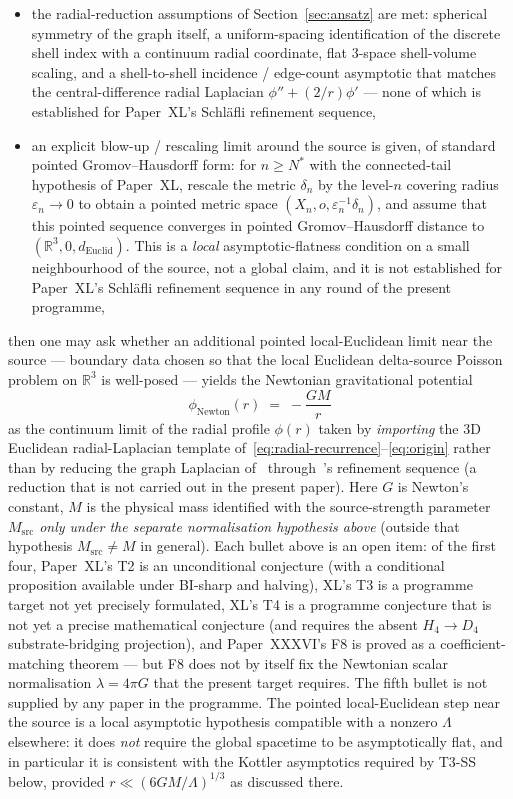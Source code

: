 \documentclass[12pt]{article}
\theoremstyle{definition}
\theoremstyle{remark}
\begin{document}
\begin{itemize}
\item the radial-reduction assumptions of Section~\ref{sec:ansatz} are met: spherical symmetry of the graph itself, a uniform-spacing identification of the discrete shell index with a continuum radial coordinate, flat 3-space shell-volume scaling, and a shell-to-shell incidence / edge-count asymptotic that matches the central-difference radial Laplacian $\phi'' + (2/r)\phi'$ --- none of which is established for Paper~XL's Schl\"afli refinement sequence,
\item an explicit blow-up / rescaling limit around the source is given, of standard pointed Gromov--Hausdorff form: for $n \geq N^*$ with the connected-tail hypothesis of Paper~XL, rescale the metric $\delta_n$ by the level-$n$ covering radius $\varepsilon_n \to 0$ to obtain a pointed metric space $(X_n, o, \varepsilon_n^{-1}\delta_n)$, and assume that this pointed sequence converges in pointed Gromov--Hausdorff distance to $(\mathbb{R}^3, 0, d_{\mathrm{Euclid}})$. This is a \emph{local} asymptotic-flatness condition on a small neighbourhood of the source, not a global claim, and it is not established for Paper~XL's Schl\"afli refinement sequence in any round of the present programme,
\end{itemize}
then one may ask whether an additional pointed local-Euclidean limit near the source --- boundary data chosen so that the local Euclidean delta-source Poisson problem on $\mathbb{R}^3$ is well-posed --- yields the Newtonian gravitational potential
\begin{equation}
\phi_{\mathrm{Newton}}(r) \;=\; -\frac{GM}{r}
\end{equation}
as the continuum limit of the radial profile $\phi(r)$ taken by \emph{importing} the 3D Euclidean radial-Laplacian template of~\eqref{eq:radial-recurrence}--\eqref{eq:origin} rather than by reducing the graph Laplacian of~\citep{SmartXXVII} through~\citep{SmartXL}'s refinement sequence (a reduction that is not carried out in the present paper). Here $G$ is Newton's constant, $M$ is the physical mass identified with the source-strength parameter $M_{\mathrm{src}}$ \emph{only under the separate normalisation hypothesis above} (outside that hypothesis $M_{\mathrm{src}} \neq M$ in general). Each bullet above is an open item: of the first four, Paper~XL's T2 is an unconditional conjecture (with a conditional proposition available under BI-sharp and halving), XL's T3 is a programme target not yet precisely formulated, XL's T4 is a programme conjecture that is not yet a precise mathematical conjecture (and requires the absent $H_4 \to D_4$ substrate-bridging projection), and Paper~XXXVI's F8 is proved as a coefficient-matching theorem --- but F8 does not by itself fix the Newtonian scalar normalisation $\lambda = 4\pi G$ that the present target requires. The fifth bullet is not supplied by any paper in the programme. The pointed local-Euclidean step near the source is a local asymptotic hypothesis compatible with a nonzero $\Lambda$ elsewhere: it does \emph{not} require the global spacetime to be asymptotically flat, and in particular it is consistent with the Kottler asymptotics required by T3-SS below, provided $r \ll (6GM/\Lambda)^{1/3}$ as discussed there.
\end{document}
